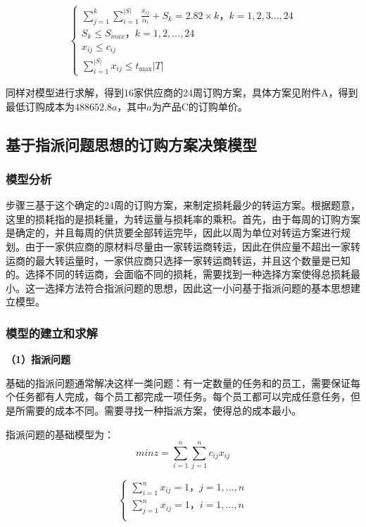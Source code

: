 \documentclass[withoutpreface,bwprint]{cumcmthesis} %
\begin{document}
\begin{equation}
    \begin{cases}
        \sum_{j = 1}^{k}  \sum_{i = 1}^{|S|} \frac{x_{i j}}{\alpha_i}+S_k=2.82\times k\text{，}k=1,2,3...,24\\
        S_k\leq S_{m a x}\text{，}k=1,2,...,24\\
        x_{ij}\leq c_{ij}\\
        \sum\limits_{i = 1}^{|S|} x_{ij} \leq t_{\mathrm{max}}|T|
    \end{cases}
\end{equation}

同样对模型进行求解，得到16家供应商的24周订购方案，具体方案见附件A，得到最低订购成本为$488652.8a$，其中$a$为产品C的订购单价。


\subsection{基于指派问题思想的订购方案决策模型}
\subsubsection{模型分析}
步骤三基于这个确定的24周的订购方案，来制定损耗最少的转运方案。根据题意，这里的损耗指的是损耗量，为转运量与损耗率的乘积。首先，由于每周的订购方案是确定的，并且每周的供货要全部转运完毕，因此以周为单位对转运方案进行规划。由于一家供应商的原材料尽量由一家转运商转运，因此在供应量不超出一家转运商的最大转运量时，一家供应商只选择一家转运商转运，并且这个数量是已知的。选择不同的转运商，会面临不同的损耗，需要找到一种选择方案使得总损耗最小。这一选择方法符合指派问题的思想，因此这一小问基于指派问题的基本思想建立模型。

\subsubsection{模型的建立和求解}
\noindent\textbf{（1）指派问题}

基础的指派问题通常解决这样一类问题：有一定数量的任务和的员工，需要保证每个任务都有人完成，每个员工都完成一项任务。每个员工都可以完成任意任务，但是所需要的成本不同。需要寻找一种指派方案，使得总的成本最小。

指派问题的基础模型为：
\begin{equation}
    min z=\sum_{i = 1}^{n} \sum_{j = 1}^{n}  c_{ij}x_{ij}
    \label{指派问题目标函数}
\end{equation}

\begin{equation}
    \begin{cases}
        \sum_{i = 1}^{n} x_{ij}=1\text{，} j=1,...,n\\
        \sum_{j = 1}^{n} x_{ij}=1\text{，} i=1,...,n\\
    \end{cases}
    \label{指派问题约束条件}
\end{equation}
\end{document}
